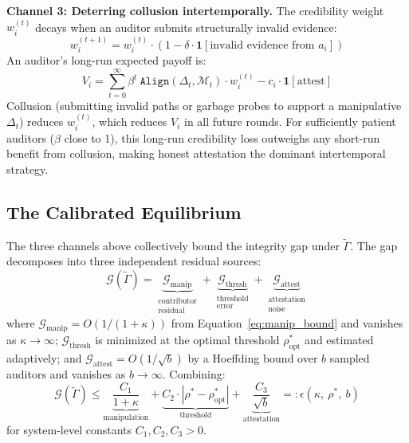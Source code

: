 \textbf{Channel 3: Deterring collusion intertemporally.}
The credibility weight $w_i^{(t)}$ decays when an auditor submits
structurally invalid evidence:
\begin{equation}
    w_i^{(t+1)} = w_i^{(t)} \cdot
    \left(1 - \delta \cdot
    \mathbf{1}[\text{invalid evidence from } a_i]\right)
\end{equation}
An auditor's long-run expected payoff is:
\begin{equation}
    V_i = \sum_{t=0}^{\infty} \beta^t\
    \texttt{Align}(\Delta_t, \mathcal{M}_t) \cdot w_i^{(t)}
    - c_i \cdot \mathbf{1}[\text{attest}]
\end{equation}
Collusion (submitting invalid paths or garbage probes to support a
manipulative $\Delta_t$) reduces $w_i^{(t)}$, which reduces $V_i$
in all future rounds. For sufficiently patient auditors ($\beta$
close to 1), this long-run credibility loss outweighs any short-run
benefit from collusion, making honest attestation the dominant
intertemporal strategy.

\subsection{The Calibrated Equilibrium}
\label{app:calibrated_equilibrium}

The three channels above collectively bound the integrity gap under
$\tilde{\Gamma}$. The gap decomposes into three independent residual
sources:
\begin{equation}
    \mathcal{G}(\tilde{\Gamma}) =
    \underbrace{\mathcal{G}_{\text{manip}}}_{\substack{\text{contributor}\\
    \text{residual}}}
    + \underbrace{\mathcal{G}_{\text{thresh}}}_{\substack{\text{threshold}\\
    \text{error}}}
    + \underbrace{\mathcal{G}_{\text{attest}}}_{\substack{\text{attestation}\\
    \text{noise}}}
\end{equation}
where $\mathcal{G}_{\text{manip}} = O(1/(1+\kappa))$ from
Equation~\eqref{eq:manip_bound} and vanishes as $\kappa \to \infty$;
$\mathcal{G}_{\text{thresh}}$ is minimized at the optimal threshold
$\rho^*_{\text{opt}}$ and estimated adaptively; and
$\mathcal{G}_{\text{attest}} = O(1/\sqrt{b})$ by a Hoeffding bound
over $b$ sampled auditors and vanishes as $b \to \infty$. Combining:
\begin{equation}
    \mathcal{G}(\tilde{\Gamma}) \leq
    \underbrace{\frac{C_1}{1 + \kappa}}_{\text{manipulation}}
    + \underbrace{C_2 \cdot |\rho^* - \rho^*_{\text{opt}}|}_{\text{threshold}}
    + \underbrace{\frac{C_3}{\sqrt{b}}}_{\text{attestation}}
    =: \epsilon(\kappa,\ \rho^*,\ b)
    \label{eq:integrity_gap_bound}
\end{equation}
for system-level constants $C_1, C_2, C_3 > 0$.

